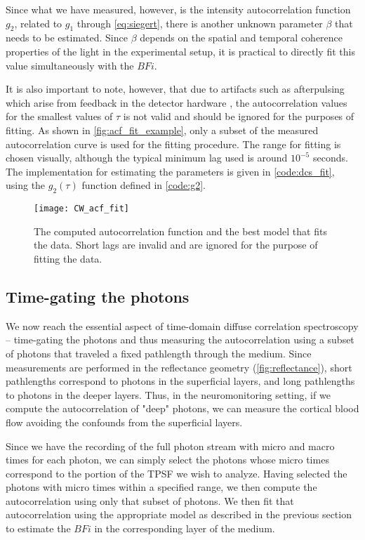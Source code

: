Since what we have measured, however, is the intensity autocorrelation function $g_2$, related to $g_1$ through \autoref{eq:siegert}, there is another unknown parameter $\beta$ that needs to be estimated. Since $\beta$ depends on the spatial and temporal coherence properties of the light in the experimental setup, it is practical to directly fit this value simultaneously with the $BFi$.

It is also important to note, however, that due to artifacts such as afterpulsing which arise from feedback in the detector hardware \cite{Zhao2003}, the autocorrelation values for the smallest values of $\tau$ is not valid and should be ignored for the purposes of fitting. As shown in \autoref{fig:acf_fit_example}, only a subset of the measured autocorrelation curve is used for the fitting procedure. The range for fitting is chosen visually, although the typical minimum lag used is around $10^{-5}$ seconds. The implementation for estimating the parameters is given in \autoref{code:dcs_fit}, using the $g_2(\tau)$ function defined in \autoref{code:g2}.

\begin{figure}[tb]
    \centering
    \texttt{[image: CW\_acf\_fit]}  
    \caption{The computed autocorrelation function and the best model that fits the data. Short lags are invalid and are ignored for the purpose of fitting the data.}
    \label{fig:acf_fit_example}  
\end{figure}

\subsection{Time-gating the photons} \label{sec:time-gate}
We now reach the essential aspect of time-domain diffuse correlation spectroscopy -- time-gating the photons and thus measuring the autocorrelation using a subset of photons that traveled a fixed pathlength through the medium. Since measurements are performed in the reflectance geometry (\autoref{fig:reflectance}), short pathlengths correspond to photons in the superficial layers, and long pathlengths to photons in the deeper layers. Thus, in the neuromonitoring setting, if we compute the autocorrelation of "deep" photons, we can measure the cortical blood flow avoiding the confounds from the superficial layers. 

Since we have the recording of the full photon stream with micro and macro times for each photon, we can simply select the photons whose micro times correspond to the portion of the TPSF we wish to analyze. Having selected the photons with micro times within a specified range, we then compute the autocorrelation using only that subset of photons. We then fit that autocorrelation using the appropriate model as described in the previous section to estimate the $BFi$ in the corresponding layer of the medium.

